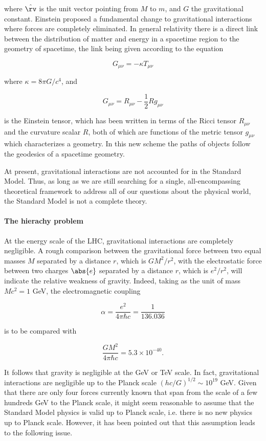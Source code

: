 where $\hat{\rv}$ is the unit vector pointing from $M$ to $m$, and $G$ the
gravitational constant. Einstein proposed a fundamental change to gravitational
interactions where forces are completely eliminated. In general relativity
there is a direct link between the distribution of matter and energy in a
spacetime region to the geometry of spacetime, the link being given according
to the equation

$$G_{\mu\nu} = -\kappa T_{\mu\nu} $$

where $\kappa = 8\pi G / c^4$, and

$$G_{\mu\nu} = R_{\mu\nu} - \frac{1}{2}R g_{\mu\nu}$$

is the Einstein tensor, which has been written in terms of the Ricci tensor
$R_{\mu\nu}$ and the curvature scalar $R$, both of which are functions of the
metric tensor $g_{\mu\nu}$ which characterizes a geometry. In this new scheme
the paths of objects follow the geodesics of a spacetime geometry.

At present, gravitational interactions are not accounted for in the Standard
Model. Thus, as long as we are still searching for a single, all-encompassing
theoretical framework to address all of our questions about the physical world,
the Standard Model is not a complete theory.

\paragraph{The hierachy problem~\cite{hier01, hier02}} At the energy scale of
the LHC, gravitational interactions are completely negligible. A rough
comparison between the gravitational force between two equal masses $M$
separated by a distance $r$, which is $GM^2 / r^2$, with the electrostatic
force between two charges $\abs{e}$ separated by a distance $r$, which is $e^2/
	r^2$, will indicate the relative weakness of gravity. Indeed, taking as the
unit of mass $Mc^2 = 1$ GeV, the electromagnetic coupling

$$ \alpha = \frac{e^2}{4\pi \hbar c} = \frac{1}{136.036}$$

is to be compared with

$$ \frac{GM^2}{4\pi\hbar c} = 5.3\times 10^{-40}.$$

It follows that gravity is negligible at the GeV or TeV scale. In fact,
gravitational interactions are negligible up to the Planck scale $(hc/ G)^{1/2}
	\sim 10^{19}$ GeV. Given that there are only four forces currently known that
span from the scale of a few hundreds GeV to the Planck scale, it might seem
reasonable to assume that the Standard Model physics is valid up to Planck
scale, i.e. there is no new physics up to Planck scale. However, it has been
pointed out that this assumption leads to the following issue.

